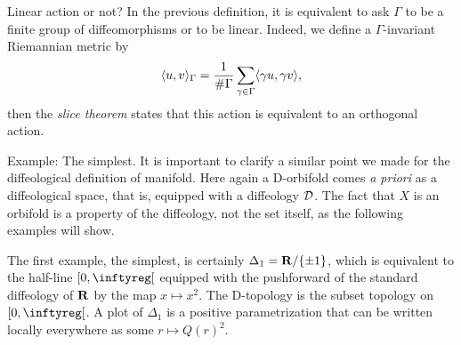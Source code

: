 \begin{Article}{Linear action or not?}{}
  In the previous definition,
  it is equivalent to ask $\Gamma$ to be a finite group of diffeomorphisms or to be linear.
  Indeed,
  we define a $\Gamma$-invariant Riemannian metric by
  $$
    \langle u,v \rangle_\Gamma = {1 \over \# \Gamma} \sum_{\gamma \in \Gamma} \langle \gamma u,\gamma v \rangle,
  $$
  then the {\em slice theorem} states that this action is equivalent to an orthogonal action.
\end{Article}

\begin{Article}{Example: The simplest.}{}
  It is important to clarify a similar point we made for the diffeological definition of manifold.
  Here again a D-orbifold comes \emph{a priori} as a diffeological space,
  that is,
  equipped with a diffeology $\mathcal{D}$.
  The fact that $X$ is an orbifold is a property of the diffeology,
  not the set itself,
  as the following examples will show.

  The first example,
  the simplest,
  is certainly $\Delta_1 = \mathbf{R} /\{\pm 1\}$,
  which is equivalent to the half-line $\LeftClosedInterval{0,\infty}$ equipped with the pushforward of the standard diffeology of $\mathbf{R}$ by the map $x \mapsto x^2$.
  The D-topology is the subset topology on $\LeftClosedInterval{0,\infty}$.
  A plot of $\Delta_1$ is a positive parametrization that can be written locally everywhere as some $r \mapsto Q(r)^2$.
\end{Article}

